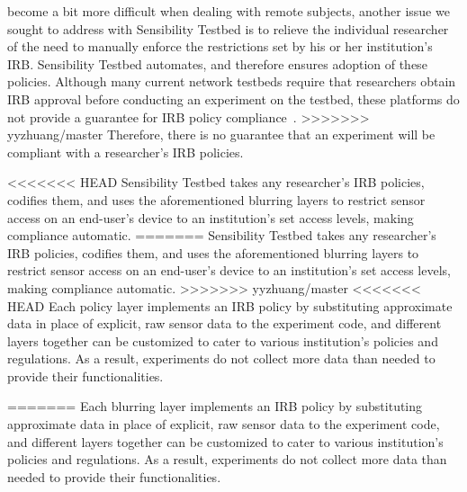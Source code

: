 {become a bit more difficult when dealing with remote subjects, another 
issue we sought to address with Sensibility Testbed is to relieve the 
individual researcher of the need to manually enforce the restrictions 
set by his or her institution's IRB. Sensibility Testbed automates, and 
therefore ensures adoption of these policies. Although many current network 
testbeds require that researchers obtain IRB approval before conducting
an experiment on the testbed, these platforms do not provide a guarantee 
for IRB policy compliance~\cite{nandugudi2013phonelab, nikravesh2015mobilyzer}.
>>>>>>> yyzhuang/master
Therefore, there is no guarantee that an 
experiment will be compliant with a researcher's IRB policies.

<<<<<<< HEAD
Sensibility Testbed takes any researcher's IRB policies, codifies them, and uses the aforementioned blurring layers 
 to restrict sensor access on an end-user's device to 
an institution's set access levels, making compliance automatic. 
=======
Sensibility Testbed takes any researcher's IRB policies, codifies them, and 
uses the aforementioned blurring layers to restrict sensor access on an 
end-user's device to an institution's set access levels, making compliance 
automatic. 
>>>>>>> yyzhuang/master
<<<<<<< HEAD
Each policy layer implements an IRB policy by substituting 
approximate data in place of explicit, raw sensor data to the experiment code, and different layers 
together can be customized to cater to various institution's 
policies and regulations. As a result, experiments 
do not collect more data than needed to provide their functionalities.

=======
Each blurring layer implements an IRB policy by substituting approximate 
data in place of explicit, raw sensor data to the experiment code, and different 
layers together can be customized to cater to various institution's 
policies and regulations. As a result, experiments do not collect more 
data than needed to provide their functionalities.

}
